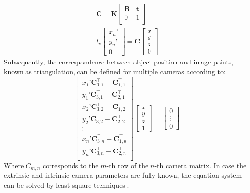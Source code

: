 \documentclass[5p,times,procedia]{elsarticle}
\begin{document}
%
\begin{align}
	\mathbf{C} = \mathbf{K}
	\begin{bmatrix}
		\mathbf{R} & \mathbf{t} \\
		0 & 1 \\
	\end{bmatrix} \\
	l_{n}
	\begin{bmatrix}
		x_n’ \\
		y_n’ \\
		0
	\end{bmatrix}
	= \mathbf{C}
	\begin{bmatrix}
		x \\
		y \\
		z \\
		0
	\end{bmatrix}
\end{align}
%
Subsequently, the correspondence between object position and image points, known as triangulation, can be defined for multiple cameras according to:
%
\begin{equation}
	\label{eqn:triangulation}
	\begin{bmatrix}
		x_{1}’ \mathbf{C}_{3,1}^{\top} - \mathbf{C}_{1,1}^{\top}\\
		y_{1}’ \mathbf{C}_{3,1}^{\top} - \mathbf{C}_{2,1}^{\top}\\
		x_{2}’ \mathbf{C}_{3,2}^{\top} - \mathbf{C}_{1,2}^{\top}\\
		y_{2}’ \mathbf{C}_{3,2}^{\top} - \mathbf{C}_{2,2}^{\top}\\
		\vdots \\
		x_{n}’ \mathbf{C}_{3,n}^{\top} - \mathbf{C}_{1,n}^{\top}\\
		y_{n}’ \mathbf{C}_{3,n}^{\top} - \mathbf{C}_{2,n}^{\top}\\
	\end{bmatrix}
	\begin{bmatrix}
		x \\
		y \\
		z \\
		1
	\end{bmatrix}
	=
	\begin{bmatrix}
		0 \\
		\vdots \\
		0
	\end{bmatrix}
\end{equation}
%
Where $C_{m,n}$ corresponds to the $m$-th row of the $n$-th camera matrix.
In case the extrinsic and intrinsic camera parameters are fully known, the equation system can be solved by least-square techniques \cite{Ahn2004}.\\
\end{document}
